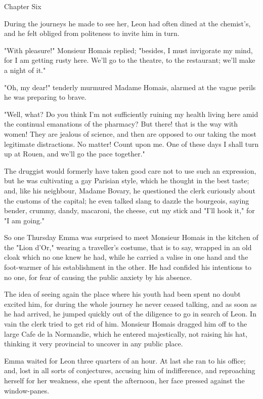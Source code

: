 \documentclass{tufte-book}
\begin{document}
Chapter Six

During the journeys he made to see her, Leon had often dined at the
chemist's, and he felt obliged from politeness to invite him in turn.

"With pleasure!" Monsieur Homais replied; "besides, I must invigorate
my mind, for I am getting rusty here. We'll go to the theatre, to the
restaurant; we'll make a night of it."

"Oh, my dear!" tenderly murmured Madame Homais, alarmed at the vague
perils he was preparing to brave.

"Well, what? Do you think I'm not sufficiently ruining my health living
here amid the continual emanations of the pharmacy? But there! that is
the way with women! They are jealous of science, and then are opposed to
our taking the most legitimate distractions. No matter! Count upon
me. One of these days I shall turn up at Rouen, and we'll go the pace
together."

The druggist would formerly have taken good care not to use such an
expression, but he was cultivating a gay Parisian style, which he
thought in the best taste; and, like his neighbour, Madame Bovary, he
questioned the clerk curiously about the customs of the capital; he
even talked slang to dazzle the bourgeois, saying bender, crummy, dandy,
macaroni, the cheese, cut my stick and "I'll hook it," for "I am going."

So one Thursday Emma was surprised to meet Monsieur Homais in the
kitchen of the "Lion d'Or," wearing a traveller's costume, that is to
say, wrapped in an old cloak which no one knew he had, while he carried
a valise in one hand and the foot-warmer of his establishment in the
other. He had confided his intentions to no one, for fear of causing the
public anxiety by his absence.

The idea of seeing again the place where his youth had been spent no
doubt excited him, for during the whole journey he never ceased talking,
and as soon as he had arrived, he jumped quickly out of the diligence
to go in search of Leon. In vain the clerk tried to get rid of him.
Monsieur Homais dragged him off to the large Cafe de la Normandie,
which he entered majestically, not raising his hat, thinking it very
provincial to uncover in any public place.

Emma waited for Leon three quarters of an hour. At last she ran to
his office; and, lost in all sorts of conjectures, accusing him of
indifference, and reproaching herself for her weakness, she spent the
afternoon, her face pressed against the window-panes.
\end{document}
